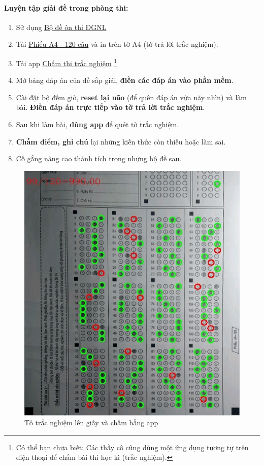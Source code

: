 \paragraph{Luyện tập giải đề trong phòng thi:}\label{sec:giaidephongthi}
\begin{enumerate}
    \item Sử dụng \href{https://www.example.com}{Bộ đề ôn thi ĐGNL} \cite{bo_de_thidgnl}
    \item Tải \href{https://drive.google.com/file/d/1IhtAQb20qTUOxD3zjC1bvKnkarBYnSok/view?usp=drive_link}{Phiếu A4 - 120 câu} \cite{phieuA4} và in trên tờ A4 (tờ trả lời trắc nghiệm).
    \item Tải app \href{https://play.google.com/store/apps/details?id=com.quiz.marker}{Chấm thi trắc nghiệm} \cite{appchamthi} \footnote{Có thể bạn chưa biết: Các thầy cô cũng dùng một ứng dụng tương tự trên điện thoại để chấm bài thi học kì (trắc nghiệm).}
    \item Mở bảng đáp án của đề sắp giải, \textbf{điền các đáp án vào phần mềm}.
    \item Cài đặt bộ đếm giờ, \textbf{reset lại não} (để quên đáp án vừa nãy nhìn) và làm bài. \textbf{Điền đáp án trực tiếp vào tờ trả lời trắc nghiệm}.
    \item Sau khi làm bài, \textbf{dùng app} để quét tờ trắc nghiệm. 
    \item \textbf{Chấm điểm, ghi chú} lại những kiến thức còn thiếu hoặc làm sai. 
    \item Cố gắng nâng cao thành tích trong những bộ đề sau.
\end{enumerate}
\begin{figure}[H]
    \centering
    \includegraphics[width=0.7\linewidth]{img/cham_bang_app.jpg}
    \caption{Tô trắc nghiệm lên giấy và chấm bằng app}
    \label{fig:chambângppp}
\end{figure}


